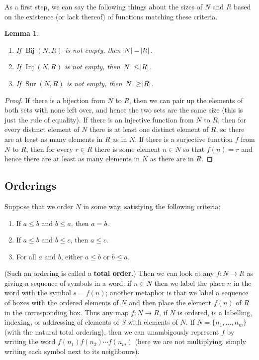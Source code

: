 \documentclass[a4paper,leqno]{article}
\numberwithin{equation}{section}
\newtheorem{lem}[equation]{Lemma}
\theoremstyle{definition}
\theoremstyle{remark}
\newcommand{\df}[1]{\textbf{#1}}
\DeclareMathOperator{\Sur}{Sur}
\DeclareMathOperator{\Inj}{Inj}
\DeclareMathOperator{\Bij}{Bij}
\begin{document}
As a first step, we can say the following things about the sizes of $ N $ and $ R $ based on the existence (or lack thereof) of functions
matching these criteria.
\begin{lem}\leavevmode
  \begin{enumerate}
    \item If $ \Bij(N,R) $ is not empty, then $ \abs{N} = \abs{R} $.
    \item If $ \Inj(N,R) $ is not empty, then $ \abs{N} \leq \abs{R} $.
    \item If $ \Sur(N,R) $ is not empty, then $ \abs{N} \geq \abs{R} $.
  \end{enumerate}
\end{lem}
\begin{proof}
  If there is a bijection from $ N $ to $ R $, then we can pair up the elements of both sets with none left over, and hence the
  two sets are the same size (this is just the rule of equality). If there is an injective function from $ N $ to $ R $, then for
  every distinct element of $ N $ there is at least one distinct element of $ R $, so there are at least as many elements in $ R $
  as in $ N $. If there is a surjective function $ f $ from $ N $ to $ R $, then for every $ r \in R $ there is some element $ n \in N $
  so that $ f(n) = r $ and hence there are at least as many elements in $ N $ as there are in $ R $.
\end{proof}

\subsection{Orderings}
Suppose that we order $ N $ in some way, satisfying the following criteria:
\begin{enumerate}
  \item If $ a \leq b $ and $ b \leq a $, then $ a = b $.
  \item If $ a \leq b $ and $ b \leq c $, then $ a \leq c $.
  \item For all $ a $ and $ b $, either $ a \leq b $ or $ b \leq a $.
\end{enumerate}
(Such an ordering is called a \df{total order}.) Then we can look at any $ f : N \to R $ as giving a sequence of symbols in a
word: if $ n \in N $ then we label the place $ n $ in the word with the symbol $ s = f(n) $; another metaphor is that we label
a sequence of boxes with the ordered elements of $ N $ and then place the element $ f(n) $ of $ R $ in the corresponding box.
Thus any map $ f : N \to R $, if $ N $ is ordered, is a labelling, indexing, or addressing of elements of $ S $ with elements of $ N $.
If $ N = \{n_1, ..., n_m\} $ (with the natural total ordering), then we can unambigously represent $ f $ by writing the word $ f(n_1) f(n_2) \cdots f(n_m) $
(here we are not multiplying, simply writing each symbol next to its neighbours).
\end{document}
